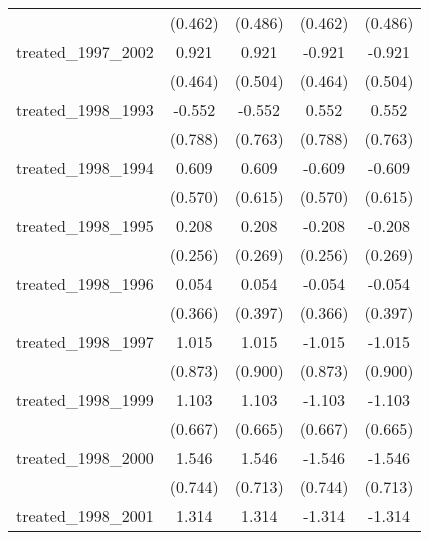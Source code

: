 {\begin{tabular}{l*{4}{c}}
            &     (0.462)         &     (0.486)         &     (0.462)         &     (0.486)         \\
[1em]
treated\_1997\_2002&       0.921\sym{*}  &       0.921         &      -0.921\sym{*}  &      -0.921         \\
            &     (0.464)         &     (0.504)         &     (0.464)         &     (0.504)         \\
[1em]
treated\_1998\_1993&      -0.552         &      -0.552         &       0.552         &       0.552         \\
            &     (0.788)         &     (0.763)         &     (0.788)         &     (0.763)         \\
[1em]
treated\_1998\_1994&       0.609         &       0.609         &      -0.609         &      -0.609         \\
            &     (0.570)         &     (0.615)         &     (0.570)         &     (0.615)         \\
[1em]
treated\_1998\_1995&       0.208         &       0.208         &      -0.208         &      -0.208         \\
            &     (0.256)         &     (0.269)         &     (0.256)         &     (0.269)         \\
[1em]
treated\_1998\_1996&       0.054         &       0.054         &      -0.054         &      -0.054         \\
            &     (0.366)         &     (0.397)         &     (0.366)         &     (0.397)         \\
[1em]
treated\_1998\_1997&       1.015         &       1.015         &      -1.015         &      -1.015         \\
            &     (0.873)         &     (0.900)         &     (0.873)         &     (0.900)         \\
[1em]
treated\_1998\_1999&       1.103         &       1.103         &      -1.103         &      -1.103         \\
            &     (0.667)         &     (0.665)         &     (0.667)         &     (0.665)         \\
[1em]
treated\_1998\_2000&       1.546\sym{*}  &       1.546\sym{*}  &      -1.546\sym{*}  &      -1.546\sym{*}  \\
            &     (0.744)         &     (0.713)         &     (0.744)         &     (0.713)         \\
[1em]
treated\_1998\_2001&       1.314\sym{**} &       1.314\sym{***}&      -1.314\sym{**} &      -1.314\sym{***}\\

\end{tabular}}
